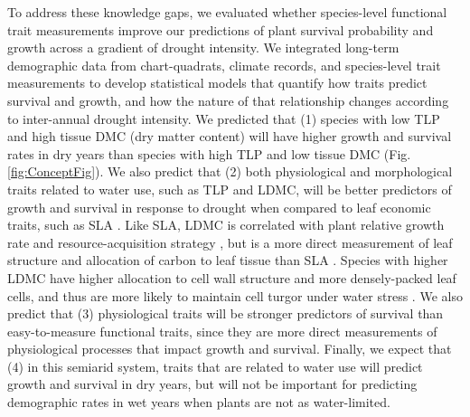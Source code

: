 \documentclass[12pt, letterpaper]{article}
\begin{document}
To address these knowledge gaps, we evaluated whether species-level functional trait measurements improve our predictions of plant survival probability and growth across a gradient of drought intensity. We integrated long-term demographic data from chart-quadrats, climate records, and species-level trait measurements to develop statistical models that quantify how traits predict survival and growth, and how the nature of that relationship changes according to inter-annual drought intensity. We predicted that (1) species with low TLP and high tissue DMC (dry matter content) will have higher growth and survival rates in dry years than species with high TLP and low tissue DMC (Fig. \ref{fig:ConceptFig}). We also predict that (2) both physiological and morphological traits related to water use, such as TLP and LDMC, will be better predictors of growth and survival in response to drought when compared to leaf economic traits, such as SLA \citep{Wright2004, Reich2014}. Like SLA, LDMC is correlated with plant relative growth rate and resource-acquisition strategy \citep{Weiher1999ChallengingEcology}, but is a more direct measurement of leaf structure and allocation of carbon to leaf tissue than SLA \citep{Niinemets1999ComponentsPlants,Hodgson2011}. Species with higher LDMC have higher allocation to cell wall structure and more densely-packed leaf cells, and thus are more likely to maintain cell turgor under water stress \citep{Niinemets2001Global-scaleShrubs,Poorter2009CausesMeta-analysis,Wilcox2020PlantPrairie}. We also predict that (3) physiological traits will be stronger predictors of survival than easy-to-measure functional traits, since they are more direct measurements of physiological processes that impact growth and survival. Finally, we expect that (4) in this semiarid system, traits that are related to water use will predict growth and survival in dry years, but will not be important for predicting demographic rates in wet years when plants are not as water-limited. 
\end{document}
